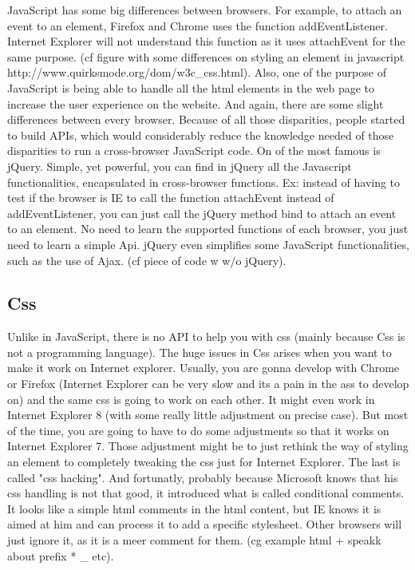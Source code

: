 JavaScript has some big differences between browsers. For example, to attach an event to an element, Firefox and Chrome uses the function addEventListener. Internet Explorer will not understand this function as it uses attachEvent for the same purpose. (cf figure with some differences on styling an element in javascript http://www.quirksmode.org/dom/w3c\_css.html).
Also, one of the purpose of JavaScript is being able to handle all the html elements in the web page to increase the user experience on the website. And again, there are some slight differences between every browser.
Because of all those disparities, people started to build APIs, which would considerably reduce the knowledge needed of those disparities to run a cross-browser JavaScript code. On of the most famous is jQuery. Simple, yet powerful, you can find in jQuery all the Javascript functionalities, encapsulated in cross-browser functions. Ex: instead of having to test if the browser is IE to call the function attachEvent instead of addEventListener, you can just call the jQuery method bind to attach an event to an element. No need to learn the supported functions of each browser, you just need to learn a simple Api. jQuery even simplifies some JavaScript functionalities, such as the use of Ajax. (cf piece of code w w/o jQuery).

\subsection{Css}
Unlike in JavaScript, there is no API to help you with css (mainly because Css is not a programming language). The huge issues in Css arises when you want to make it work on Internet explorer. Usually, you are gonna develop with Chrome or Firefox (Internet Explorer can be very slow and its a pain in the ass to develop on) and the same css is going to work on each other. It might even work in Internet Explorer 8 (with some really little adjustment on precise case). But most of the time, you are going to have to do some adjustments so that it works on Internet Explorer 7. Those adjustment might be to just rethink the way of styling an element to completely tweaking the css just for Internet Explorer. The last is called "css hacking". And fortunatly, probably because Microsoft knows that his css handling is not that good, it introduced what is called conditional comments. It looks like a simple html comments in the html content, but IE knows it is aimed at him and can process it to add a specific stylesheet. Other browsers will just ignore it, as it is a meer comment for them. (cg example html + speakk about prefix * \_ etc).